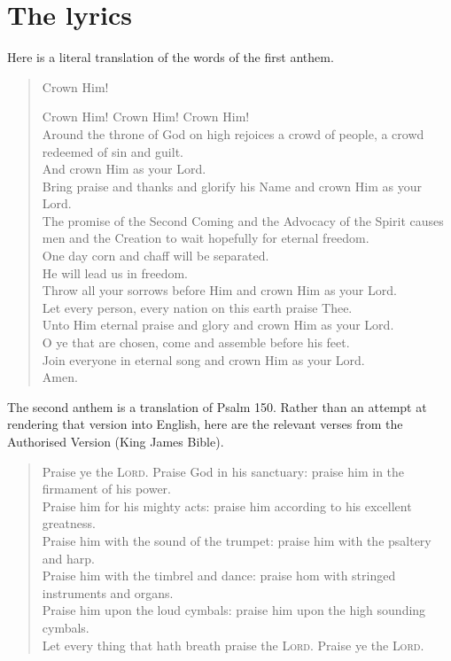 \documentclass[a4paper]{article}
\begin{document}
  \section*{The lyrics}
Here is a literal translation of the words of the first anthem.
\begin{verse}
  \begin{center} Crown Him! \end{center}
Crown Him! Crown Him! Crown Him! \\
Around the throne of God on high rejoices a crowd of people, 
a crowd redeemed of sin and guilt.  \\
And crown Him as your Lord.  \\
Bring praise and thanks and glorify his Name and crown Him as your Lord. \\
The promise of the Second Coming and the Advocacy of the Spirit causes men and
the Creation to wait hopefully for eternal freedom. \\
One day corn and chaff will be separated. \\
He will lead us in freedom. \\
Throw all your sorrows before Him and crown Him as your Lord. \\
Let every person, every nation on this earth praise Thee. \\
Unto Him eternal praise and glory and crown Him as your Lord. \\
O ye that are chosen, come and assemble before his feet. \\
Join everyone in eternal song and crown Him as your Lord. \\
Amen.
\end{verse}

The second anthem is a translation of Psalm 150.  Rather than
an attempt at rendering that version into English, here are the
relevant verses from the Authorised Version (King James Bible).
\begin{verse}
  Praise ye the \textsc{Lord}.  Praise God in his sanctuary: praise
him in the firmament of his power. \\
  Praise him for his mighty acts: praise him according to his excellent
greatness. \\
  Praise him with the sound of the trumpet: praise him with the psaltery
and harp. \\
  Praise him with the timbrel and dance: praise hom with stringed instruments 
and organs. \\
  Praise him upon the loud cymbals: praise him upon the high sounding 
cymbals. \\
  Let every thing that hath breath praise the \textsc{Lord}.
 Praise ye the \textsc{Lord}. 
\end{verse}
\end{document}
